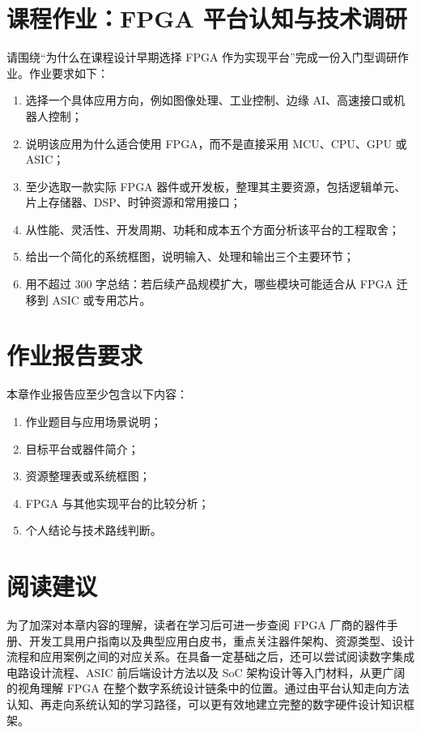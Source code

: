 \section{课程作业：FPGA
平台认知与技术调研}\label{ux8bfeux7a0bux4f5cux4e1afpga-ux5e73ux53f0ux8ba4ux77e5ux4e0eux6280ux672fux8c03ux7814}

请围绕``为什么在课程设计早期选择 FPGA
作为实现平台''完成一份入门型调研作业。作业要求如下：

\begin{enumerate}
\def\labelenumi{\arabic{enumi}.}
\tightlist
\item
  选择一个具体应用方向，例如图像处理、工业控制、边缘
  AI、高速接口或机器人控制；
\item
  说明该应用为什么适合使用 FPGA，而不是直接采用 MCU、CPU、GPU 或 ASIC；
\item
  至少选取一款实际 FPGA
  器件或开发板，整理其主要资源，包括逻辑单元、片上存储器、DSP、时钟资源和常用接口；
\item
  从性能、灵活性、开发周期、功耗和成本五个方面分析该平台的工程取舍；
\item
  给出一个简化的系统框图，说明输入、处理和输出三个主要环节；
\item
  用不超过 300 字总结：若后续产品规模扩大，哪些模块可能适合从 FPGA
  迁移到 ASIC 或专用芯片。
\end{enumerate}

\section{作业报告要求}\label{ux4f5cux4e1aux62a5ux544aux8981ux6c42}

本章作业报告应至少包含以下内容：

\begin{enumerate}
\def\labelenumi{\arabic{enumi}.}
\tightlist
\item
  作业题目与应用场景说明；
\item
  目标平台或器件简介；
\item
  资源整理表或系统框图；
\item
  FPGA 与其他实现平台的比较分析；
\item
  个人结论与技术路线判断。
\end{enumerate}

\section{阅读建议}\label{ux9605ux8bfbux5efaux8bae}

为了加深对本章内容的理解，读者在学习后可进一步查阅 FPGA
厂商的器件手册、开发工具用户指南以及典型应用白皮书，重点关注器件架构、资源类型、设计流程和应用案例之间的对应关系。在具备一定基础之后，还可以尝试阅读数字集成电路设计流程、ASIC
前后端设计方法以及 SoC 架构设计等入门材料，从更广阔的视角理解 FPGA
在整个数字系统设计链条中的位置。通过由平台认知走向方法认知、再走向系统认知的学习路径，可以更有效地建立完整的数字硬件设计知识框架。

